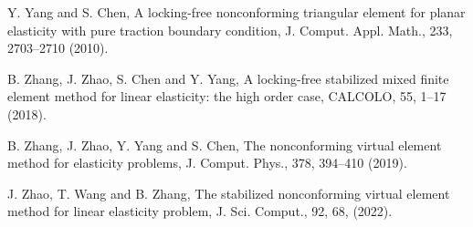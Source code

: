 \documentclass[11pt]{article}
\numberwithin{equation}{section}
\begin{document}
\begin{thebibliography}{99.}
 Y. Yang and  S. Chen, A locking-free nonconforming triangular element for planar elasticity with pure traction boundary condition, J. Comput. Appl. Math., 233, 2703--2710 (2010).


 B. Zhang, J. Zhao, S. Chen and  Y. Yang, A locking-free stabilized mixed finite element method for linear elasticity: the high order case, CALCOLO, 55, 1--17 (2018).

 B. Zhang, J. Zhao, Y. Yang and  S. Chen, The nonconforming virtual element method for elasticity problems, J. Comput. Phys., 378, 394--410 (2019).

 J. Zhao, T. Wang and  B. Zhang, The stabilized nonconforming virtual element method for linear elasticity problem, J. Sci. Comput., 92, 68, (2022).

\end{thebibliography}
\end{document}
